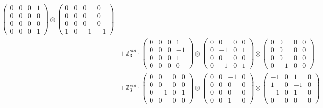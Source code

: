 \documentclass{article}
\begin{document}
{\begin{align}
        \begin{pmatrix} 0 & 0 & 0 & 1 \\ 0 & 0 & 0 & 0 \\ 0 & 0 & 0 & 0 \\ 0 & 0 & 0 & 1 \end{pmatrix} \otimes 
        \begin{pmatrix} 0 & 0 & 0 & 0 \\ 0 & 0 & 0 & 0 \\ 0 & 0 & 0 & 0 \\ 1 & 0 & -1 & -1 \end{pmatrix} \\ 
    &+ \label{Rs12-Rc12-Solution-Transformed-c21} \mathbb{Z}_3^{std} \cdot 
        \begin{pmatrix} 0 & 0 & 0 & 1 \\ 0 & 0 & 0 & -1 \\ 0 & 0 & 0 & 1 \\ 0 & 0 & 0 & 0 \end{pmatrix} \otimes 
        \begin{pmatrix} 0 & 0 & 0 & 0 \\ 0 & -1 & 0 & 1 \\ 0 & 0 & 0 & 0 \\ 0 & -1 & 0 & 1 \end{pmatrix} \otimes 
        \begin{pmatrix} 0 & 0 & 0 & 0 \\ 0 & 0 & 0 & 0 \\ 0 & 0 & 0 & 0 \\ 0 & -1 & 0 & 0 \end{pmatrix} \\ 
    &+ \label{Rs12-Rc12-Solution-Transformed-c22} \mathbb{Z}_3^{std} \cdot 
        \begin{pmatrix} 0 & 0 & 0 & 0 \\ 0 & 0 & 0 & 0 \\ 0 & -1 & 0 & 1 \\ 0 & 0 & 0 & 0 \end{pmatrix} \otimes 
        \begin{pmatrix} 0 & 0 & -1 & 0 \\ 0 & 0 & 0 & 0 \\ 0 & 0 & 0 & 0 \\ 0 & 0 & 1 & 0 \end{pmatrix} \otimes 
        \begin{pmatrix} -1 & 0 & 1 & 0 \\ 1 & 0 & -1 & 0 \\ -1 & 0 & 1 & 0 \\ 0 & 0 & 0 & 0 \end{pmatrix} \\ 

\end{align}}
\end{document}
